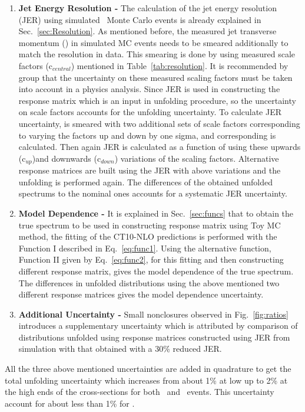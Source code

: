 \begin{enumerate}
\item {\bf Jet Energy Resolution -} The calculation of the jet energy resolution (JER) using simulated \MGP~Monte Carlo events is already explained in Sec.~\ref{sec:Resolution}. As mentioned before, the measured jet transverse momentum (\ptn) in simulated MC events needs to be smeared additionally to match the resolution in data. This smearing is done by using measured scale factors (c$_{central}$) mentioned in Table~\ref{tab:resolution}. It is recommended by \JetMet group that the uncertainty on these measured scaling factors must be taken into account in a physics analysis. Since JER is used in constructing the response matrix which is an input in unfolding procedure, so the uncertainty on scale factors accounts for the unfolding uncertainty. To calculate JER uncertainty, \pt is smeared with two additional sets of scale factors corresponding to varying the factors up and down by one sigma, and corresponding \httwo is calculated. Then again JER is calculated as a function of \httwo using these upwards (c$_{up}$)and downwards (c$_{down}$) variations of the scaling factors. Alternative response matrices are built using the JER with above variations and the unfolding is performed again. The differences of the obtained unfolded spectrums to the nominal ones accounts for a systematic JER uncertainty. 

\item {\bf Model Dependence -} It is explained in Sec.~\ref{sec:funcs} that to obtain the true \httwo spectrum to be used in constructing response matrix using Toy MC method, the fitting of the CT10-NLO predictions is performed with the Function I described in Eq.~\ref{eq:func1}. Using the alternative function, Function II given by Eq.~\ref{eq:func2}, for this fitting and then constructing different response matrix, gives the model dependence of the true \httwo spectrum. The differences in unfolded distributions using the above mentioned two different response matrices gives the model dependence uncertainty.

\item {\bf Additional Uncertainty -} Small nonclosures observed in Fig.~\ref{fig:ratios} introduces a supplementary uncertainty which is attributed by comparison of distributions unfolded using response matrices constructed using JER from simulation with that obtained with a 30\% reduced JER. 
\end{enumerate}

All the three above mentioned uncertainties are added in quadrature to get the total unfolding uncertainty which increases from about 1\% at low \httwo up to 2\% at the high \httwo ends of the cross-sections for both \njt~and \njth~events. This uncertainty account for about less than 1\% for \ratio.

